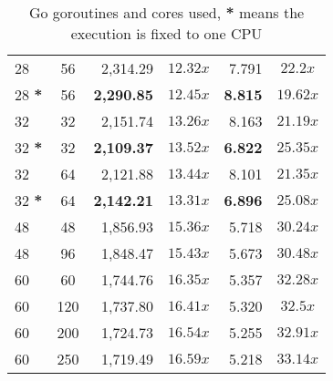 \begin{table}
\begin{tabular}{lcrcrc}
    28            & 56         &  2,314.29          & $12.32x$          &    7.791          &  $22.2x$            \\
    28 \textbf{*} & 56         &  \textbf{2,290.85} & \textbf{$12.45x$} &    \textbf{8.815} &  \textbf{$19.62x$}  \\
    32            & 32         &  2,151.74          & $13.26x$          &    8.163          &  $21.19x$           \\
    32 \textbf{*} & 32         &  \textbf{2,109.37} & \textbf{$13.52x$} &    \textbf{6.822} &  \textbf{$25.35x$}  \\
    32            & 64         &  2,121.88          & $13.44x$          &    8.101          &  $21.35x$           \\
    32 \textbf{*} & 64         &  \textbf{2,142.21} & \textbf{$13.31x$} &    \textbf{6.896} &  \textbf{$25.08x$}  \\
    48            & 48         &  1,856.93          & $15.36x$          &    5.718          &  $30.24x$           \\
    48            & 96         &  1,848.47          & $15.43x$          &    5.673          &  $30.48x$           \\
    60            & 60         &  1,744.76          & $16.35x$          &    5.357          &  $32.28x$           \\
    60            & 120        &  1,737.80          & $16.41x$          &    5.320          &  $32.5x$            \\
    60            & 200        &  1,724.73          & $16.54x$          &    5.255          &  $32.91x$           \\
    60            & 250        &  1,719.49          & $16.59x$          &    5.218          &  $33.14x$           \\
    \bottomrule
  \end{tabular}
  \caption[Go goroutines and cores]{Go goroutines and cores used, \textbf{*} means the execution is fixed to one CPU}
  \label{tab:go-routines-cores}
\end{table}


